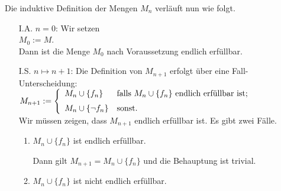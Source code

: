 Die induktive Definition der Mengen $M_n$ verl\"{a}uft nun wie folgt.
\begin{enumerate}
\item[I.A.] $n = 0$:  Wir setzen
  \\[0.2cm]
  \hspace*{1.3cm}
  $M_0 := M$.
  \\[0.2cm]
  Dann ist die Menge $M_0$ nach Voraussetzung endlich erf\"{u}llbar.
\item[I.S.] $n \mapsto n + 1$:  Die Definition von $M_{n+1}$ erfolgt \"{u}ber eine Fall-Unterscheidung:
  \\[0.2cm]
  \hspace*{1.3cm}
  $M_{n+1} := \left\{
  \begin{array}[c]{ll}
    M_n \cup \{ f_n \}      & \mbox{falls $M_n \cup \{ f_n \}$ endlich erf\"{u}llbar ist;} \\[0.2cm]
    M_n \cup \{ \neg f_n \} & \mbox{sonst.}
  \end{array}
  \right.
  $
  \\[0.2cm]
  Wir m\"{u}ssen zeigen, dass $M_{n+1}$ endlich erf\"{u}llbar ist.  Es gibt zwei F\"{a}lle.
  \begin{enumerate}
  \item $M_n \cup \{ f_n \}$ ist endlich erf\"{u}llbar.

        Dann gilt $M_{n+1} = M_n \cup \{ f_n \}$ und die Behauptung ist trivial.
  \item $M_n \cup \{ f_n \}$ ist nicht endlich erf\"{u}llbar.


\end{enumerate}
\end{enumerate}
